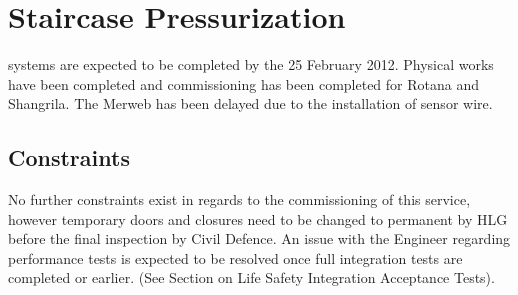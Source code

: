 
\chapter{Staircase Pressurization}



 systems are expected to be completed by the 25 February 2012. Physical works have been completed and commissioning has been completed for Rotana and Shangrila. The Merweb has been delayed due to the installation of sensor wire. 

          

\section{Constraints}


No further constraints exist in regards to the commissioning of this service, however temporary doors and closures need to be changed to permanent by HLG before the final inspection by Civil Defence. An issue with the Engineer regarding performance tests is expected to be resolved once full integration tests are completed or earlier. (See Section on Life Safety Integration Acceptance Tests).











